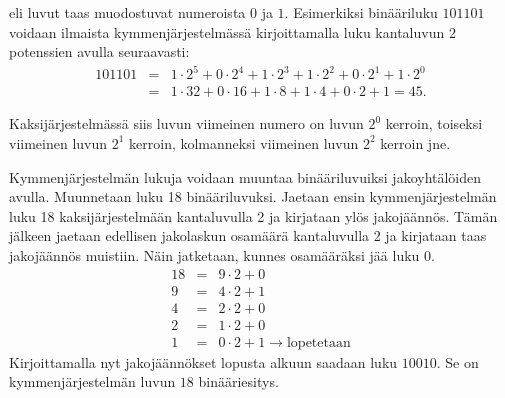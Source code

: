 \begin{kotitehtavasivu}
\begin{tehtava}
	 eli  luvut taas muodostuvat numeroista $0$ ja $1$. Esimerkiksi binääriluku $101101$ voidaan ilmaista kymmenjärjestelmässä kirjoittamalla luku kantaluvun $2$ potenssien avulla seuraavasti:
	\begin{eqnarray*}
	101101&=&1\cdot2^5+0\cdot2^4+1\cdot2^3+1\cdot2^2+0\cdot2^1+1\cdot2^0 \\
	&=& 1\cdot32+0\cdot16+1\cdot8+1\cdot4+0\cdot2+1=45.
	\end{eqnarray*}

	Kaksijärjestelmässä siis luvun viimeinen numero on luvun $2^0$ kerroin, toiseksi viimeinen luvun $2^1$ kerroin, kolmanneksi viimeinen luvun $2^2$ kerroin jne.

	Kymmenjärjestelmän lukuja voidaan muuntaa binääriluvuiksi jakoyhtälöiden avulla. Muunnetaan luku 18 binääriluvuksi. Jaetaan ensin kymmenjärjestelmän luku 18 kaksijärjestelmään kantaluvulla 2 ja kirjataan ylös jakojäännös. Tämän jälkeen jaetaan edellisen jakolaskun osamäärä kantaluvulla 2 ja kirjataan taas jakojäännös muistiin. Näin jatketaan, kunnes osamääräksi jää luku 0. 
	\begin{eqnarray*}
	18&=&9\cdot 2+0\\
	9&=&4\cdot 2+1\\
	4&=&2\cdot 2+0\\
	2&=&1\cdot 2+0\\
	1&=&0\cdot2+1 \to \textrm{lopetetaan}
	\end{eqnarray*}
	Kirjoittamalla nyt jakojäännökset lopusta alkuun saadaan luku $10010$. Se on kymmenjärjestelmän luvun $18$ binääriesitys.
	\begin{vastaus}
	\end{vastaus}
\end{tehtava}

\end{kotitehtavasivu}
